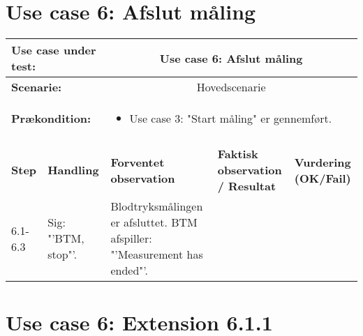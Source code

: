 \section{Use case 6: Afslut måling}
\begin{tabular}{|p{1cm}|p{3cm}|p{4cm}|p{4cm}|p{2cm}|}
\hline
\multicolumn{2}{|p{3cm}|}{\textbf{Use case under test:}} & \multicolumn{3}{c|}{Use case 6: Afslut måling} \\\hline

\multicolumn{2}{|p{3cm}|}{\textbf{Scenarie:}} & \multicolumn{3}{c|}{Hovedscenarie} \\\hline

\multicolumn{2}{|p{3cm}|}{\textbf{Prækondition:}}  & \multicolumn{3}{l|}{\parbox{0.6\textwidth}{
\begin{itemize}[label=$\circ$]
\item Use case 3: "Start måling" er gennemført.  
\end{itemize} }}\\\hline

\multicolumn{5}{|c|}{} \\\hline

\textbf{Step} & \textbf{Handling} & \textbf{Forventet observation} & \textbf{Faktisk observation / Resultat} & \textbf{Vurdering (OK/Fail)}\\\hline

6.1-6.3 & Sig: "'BTM, stop"'. & Blodtryksmålingen er afsluttet. BTM afspiller: "'Measurement has ended"'. &  & \\\hline

\end{tabular}


\section{Use case 6: Extension 6.1.1}

